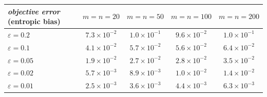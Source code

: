 \begin{tabular}{lcccc}
\toprule
\emph{objective error} (entropic bias) & $m=n=20$ & $m=n=50$ & $m=n=100$ & $m=n=200$ \\
\midrule
$\varepsilon=0.2$ & $7.3{\times}10^{-2}$ & $1.0{\times}10^{-1}$ & $9.6{\times}10^{-2}$ & $1.0{\times}10^{-1}$ \\
$\varepsilon=0.1$ & $4.1{\times}10^{-2}$ & $5.7{\times}10^{-2}$ & $5.6{\times}10^{-2}$ & $6.4{\times}10^{-2}$ \\
$\varepsilon=0.05$ & $1.9{\times}10^{-2}$ & $2.7{\times}10^{-2}$ & $2.8{\times}10^{-2}$ & $3.5{\times}10^{-2}$ \\
$\varepsilon=0.02$ & $5.7{\times}10^{-3}$ & $8.9{\times}10^{-3}$ & $1.0{\times}10^{-2}$ & $1.4{\times}10^{-2}$ \\
$\varepsilon=0.01$ & $2.5{\times}10^{-3}$ & $3.6{\times}10^{-3}$ & $4.4{\times}10^{-3}$ & $6.3{\times}10^{-3}$ \\
\bottomrule
\end{tabular}